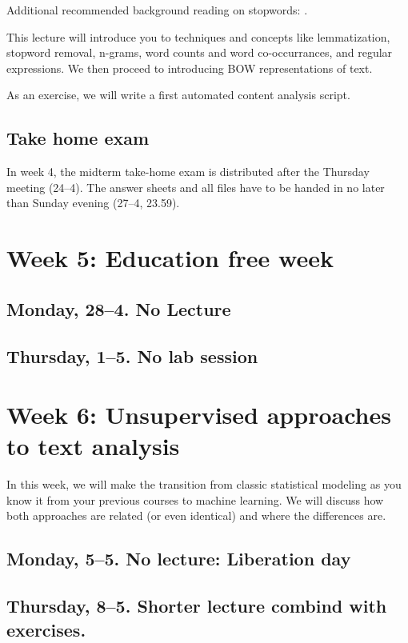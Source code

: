 Additional recommended background reading on stopwords: \cite{Nothman2018}.

This lecture will introduce you to techniques and concepts like lemmatization, stopword removal, n-grams, word counts and word co-occurrances, and regular expressions. We then proceed to introducing BOW representations of text.

As an exercise, we will write a first automated content analysis script.

\subsection*{Take home exam}

In week 4, the  midterm take-home exam is distributed after the Thursday meeting (24--4). The answer sheets and all files have to be handed in no later than Sunday evening (27--4, 23.59).



\section*{Week 5: Education free week}
\subsection*{Monday, 28--4. No Lecture}
\subsection*{Thursday, 1--5. No lab session}

\section*{Week 6: Unsupervised approaches to text analysis}
In this week, we will make the transition from classic statistical modeling as you know it from your previous courses to machine learning. We will discuss how both approaches are related  (or even identical) and where the differences are.

\subsection*{Monday, 5--5. No lecture: Liberation day}
\subsection*{Thursday, 8--5. Shorter lecture combind with exercises.}

